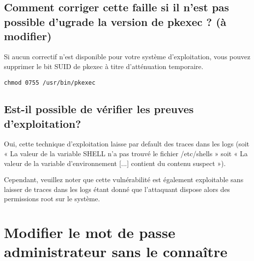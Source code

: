 \documentclass[12pt,a4paper]{article}
\begin{document}
            \subsection{Comment corriger cette faille si il n'est pas possible d'ugrade la version de pkexec ? (à modifier)}
            \begin{flushleft}
                \noindent Si aucun correctif n’est disponible pour votre système d’exploitation, vous pouvez supprimer le bit SUID de pkexec à titre d’atténuation temporaire.
                \begin{lstlisting}
chmod 0755 /usr/bin/pkexec
                \end{lstlisting}
            \end{flushleft}
            \subsection{Est-il possible de vérifier les preuves d’exploitation?}
            \begin{flushleft}
                \noindent Oui, cette technique d’exploitation laisse par default des traces dans les logs (soit « La valeur de la variable SHELL n’a pas trouvé le fichier /etc/shells » soit « La valeur de la variable d’environnement [...] contient du contenu suspect »). 
                \item Cependant, veuillez noter que cette vulnérabilité est également exploitable sans laisser de traces dans les logs étant donné que l'attaquant dispose alors des permissions root sur le système.
            \end{flushleft}
    \newpage
   \section{Modifier le mot de passe administrateur sans le connaître}
\end{document}
